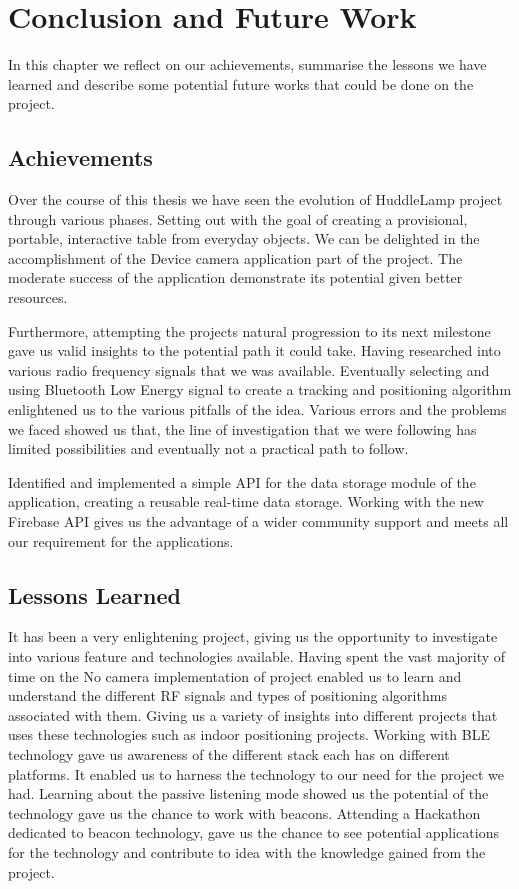 
\chapter{Conclusion and Future Work}

\label{ch:conclusions}

In this chapter we reflect on our achievements, summarise the lessons we have learned and describe some potential future works that could be done on the project.

\section{Achievements}

Over the course of this thesis we have seen the evolution of HuddleLamp project through various phases. Setting out with the goal of creating a provisional, portable, interactive table from everyday objects. We can be delighted in the accomplishment of the Device camera application part of the project. The moderate success of the application demonstrate its potential given better resources.

Furthermore, attempting the projects natural progression to its next milestone gave us valid insights to the potential path it could take. Having researched into various radio frequency signals that we was available. Eventually selecting and using Bluetooth Low Energy signal to create a tracking and positioning algorithm enlightened us to the various pitfalls of the idea. Various errors and the problems we faced showed us that, the line of investigation that we were following has limited possibilities and eventually not a practical path to follow.

Identified and implemented a simple API for the data storage module of the application, creating a reusable real-time data storage. Working with the new Firebase API gives us the advantage of a wider community support and meets all our requirement for the applications.

\section{Lessons Learned}

It has been a very enlightening project, giving us the opportunity to investigate into various feature and technologies available. Having spent the vast majority of time on the No camera implementation of project enabled us to learn and understand the different RF signals and types of positioning algorithms associated with them. Giving us a variety of insights into different projects that uses these technologies such as indoor positioning projects. 
Working with BLE technology gave us awareness of the different stack each has on different platforms. It enabled us to harness the technology to our need for the project we had. Learning about the passive listening mode showed us the potential of the technology gave us the chance to work with beacons. Attending a Hackathon dedicated to beacon technology, gave us the chance to see potential applications for the technology and contribute to idea with the knowledge gained from the project.

